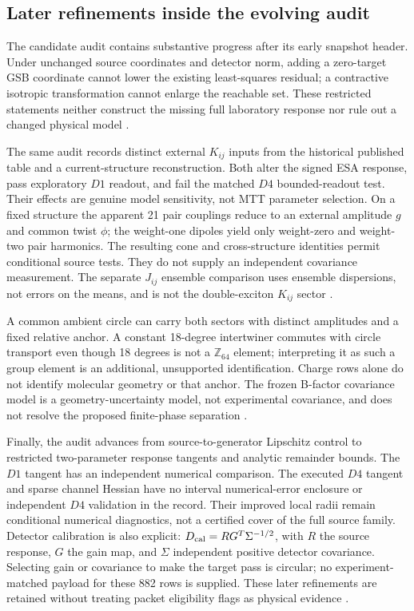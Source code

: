 \documentclass[11pt]{article}
\theoremstyle{definition}
\theoremstyle{remark}
\begin{document}
\subsection{Later refinements inside the evolving audit}
\label{sec:evolving-audit}
The candidate audit contains substantive progress after its early snapshot
header. Under unchanged source coordinates and detector norm, adding a
zero-target GSB coordinate cannot lower the existing least-squares residual;
a contractive isotropic transformation cannot enlarge the reachable set.
These restricted statements neither construct the missing full laboratory
response nor rule out a changed physical model \cite{beq01}.

The same audit records distinct external \(K_{ij}\) inputs from the
historical published table and a current-structure reconstruction. Both
alter the signed ESA response, pass exploratory \(D1\) readout, and fail
the matched \(D4\) bounded-readout test. Their effects are genuine model
sensitivity, not MTT parameter selection. On a fixed structure the apparent
21 pair couplings reduce to an external amplitude \(g\) and common twist
\(\phi\); the weight-one dipoles yield only weight-zero and weight-two
pair harmonics. The resulting cone and cross-structure identities permit
conditional source tests. They do not supply an independent covariance
measurement. The separate \(J_{ij}\) ensemble comparison uses ensemble
dispersions, not errors on the means, and is not the double-exciton
\(K_{ij}\) sector \cite{beq01}.

A common ambient circle can carry both sectors with distinct amplitudes
and a fixed relative anchor. A constant 18-degree intertwiner commutes
with circle transport even though 18 degrees is not a \(\mathbb Z_{64}\)
element; interpreting it as such a group element is an additional,
unsupported identification. Charge rows alone do not identify molecular
geometry or that anchor. The frozen B-factor covariance model is a
geometry-uncertainty model, not experimental covariance, and does not resolve
the proposed finite-phase separation \cite{beq01}.

Finally, the audit advances from source-to-generator Lipschitz control to
restricted two-parameter response tangents and analytic remainder bounds.
The \(D1\) tangent has an independent numerical comparison. The executed
\(D4\) tangent and sparse channel Hessian have no interval numerical-error
enclosure or independent \(D4\) validation in the record. Their improved
local radii remain conditional numerical diagnostics, not a certified cover
of the full source family. Detector calibration is also explicit:
\(D_{\rm cal}=RG^T\Sigma^{-1/2}\), with \(R\) the source response,
\(G\) the gain map, and \(\Sigma\) independent positive detector covariance.
Selecting gain or covariance to make the target pass is circular; no
experiment-matched payload for these 882 rows is supplied. These later
refinements are retained without treating packet eligibility flags as
physical evidence \cite{beq01}.
\end{document}

